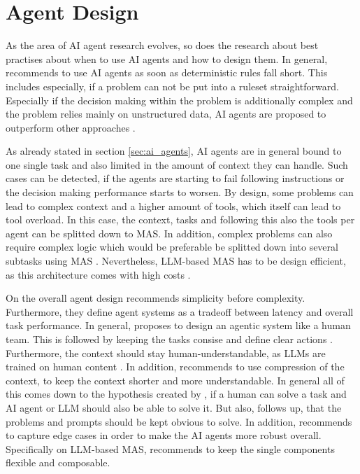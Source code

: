 \documentclass[a4paper,oneside,bibliography=totoc]{scrbook}
\begin{document}
\section{Agent Design}
\label{sec:agent_design}

As the area of \ac{AI} agent research evolves, so does the research about best practises about when to use \ac{AI} agents and how to design them. In general, \citet{OpenAI2025} recommends to use \ac{AI} agents as soon as  deterministic rules fall short. This includes especially, if a problem can not be put into a ruleset straightforward. Especially if the decision making within the problem is additionally complex and the problem relies mainly on unstructured data, \ac{AI} agents are proposed to outperform other approaches \cite{OpenAI2025}.

As already stated in section \ref{sec:ai_agents}, \ac{AI} agents are in general bound to one single task and also limited in the amount of context they can handle. Such cases can be detected, if the agents are starting to fail following instructions or the decision making performance starts to worsen. By design, some problems can lead to complex context and a higher amount of tools, which itself can lead to tool overload. In this case, the context, tasks and following this also the tools per agent can be splitted down to \ac{MAS}. In addition, complex problems can also require complex logic which would be preferable be splitted down into several subtasks using \ac{MAS} \cite{OpenAI2025,LangChain2025b}. Nevertheless, \ac{LLM}-based \ac{MAS} has to be design efficient, as this architecture comes with high costs \cite{Hadfield2025}.

On the overall agent design \citet{Anthropic2024} recommends simplicity before complexity. Furthermore, they define agent systems as a tradeoff between latency and overall task performance. In general, \citet{Hadfield2025} proposes to design an agentic system like a human team. This is followed by keeping the tasks consise and define clear actions \cite{OpenAI2025}. Furthermore, the context should stay human-understandable, as \acp{LLM} are trained on human content \cite{Anthropic2024}. In addition, \citet{Hadfield2025} recommends to use compression of the context, to keep the context shorter and more understandable. In general all of this comes down to the hypothesis created by \citet{Anthropic2024}, if a human can solve a task and \ac{AI} agent or \ac{LLM} should also be able to solve it. But also, \citet{Anthropic2024} follows up, that the problems and prompts should be kept obvious to solve. In addition, \citet{OpenAI2025} recommends to capture edge cases in order to make the \ac{AI} agents more robust overall. Specifically on \ac{LLM}-based \ac{MAS}, \citet{OpenAI2025} recommends to keep the single components flexible and composable.
\end{document}
